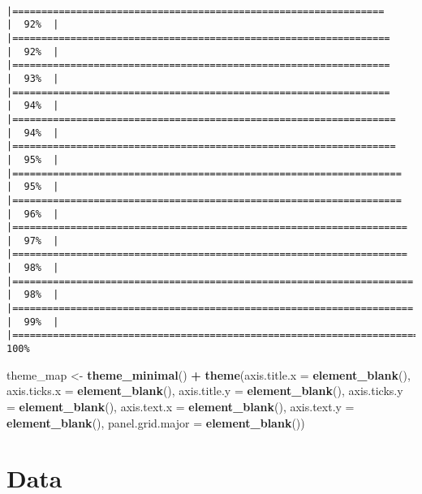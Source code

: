 \documentclass[12pt,twoside]{reedthesis}
\newenvironment{Shaded}{\begin{snugshade}}{\end{snugshade}}
\newcommand{\DataTypeTok}[1]{\textcolor[rgb]{0.13,0.29,0.53}{#1}}
\newcommand{\KeywordTok}[1]{\textcolor[rgb]{0.13,0.29,0.53}{\textbf{#1}}}
\newcommand{\NormalTok}[1]{#1}
\newcommand{\OperatorTok}[1]{\textcolor[rgb]{0.81,0.36,0.00}{\textbf{#1}}}
\newcommand{\StringTok}[1]{\textcolor[rgb]{0.31,0.60,0.02}{#1}}
\begin{document}
\begin{verbatim}
                                                                      |================================================================      |  92%  |                                                                              |=================================================================     |  92%  |                                                                              |=================================================================     |  93%  |                                                                              |=================================================================     |  94%  |                                                                              |==================================================================    |  94%  |                                                                              |==================================================================    |  95%  |                                                                              |===================================================================   |  95%  |                                                                              |===================================================================   |  96%  |                                                                              |====================================================================  |  97%  |                                                                              |====================================================================  |  98%  |                                                                              |===================================================================== |  98%  |                                                                              |===================================================================== |  99%  |                                                                              |======================================================================| 100%
\end{verbatim}
\begin{Shaded}
\begin{Highlighting}[]
\NormalTok{theme_map <-}\StringTok{ }\KeywordTok{theme_minimal}\NormalTok{() }\OperatorTok{+}
\StringTok{  }\KeywordTok{theme}\NormalTok{(}\DataTypeTok{axis.title.x =} \KeywordTok{element_blank}\NormalTok{(),}
        \DataTypeTok{axis.ticks.x =} \KeywordTok{element_blank}\NormalTok{(),}
        \DataTypeTok{axis.title.y =} \KeywordTok{element_blank}\NormalTok{(),}
        \DataTypeTok{axis.ticks.y =} \KeywordTok{element_blank}\NormalTok{(),}
        \DataTypeTok{axis.text.x =} \KeywordTok{element_blank}\NormalTok{(),}
        \DataTypeTok{axis.text.y =} \KeywordTok{element_blank}\NormalTok{(),}
        \DataTypeTok{panel.grid.major =} \KeywordTok{element_blank}\NormalTok{())}
\end{Highlighting}
\end{Shaded}
\hypertarget{data}{%
\chapter{Data}\label{data}}
\end{document}
